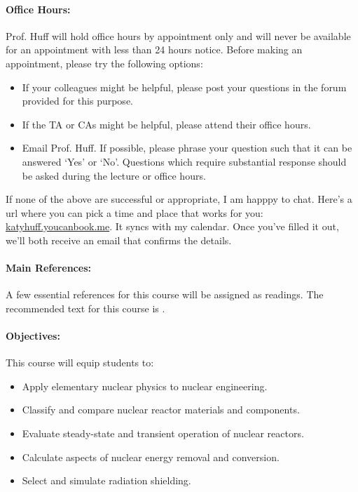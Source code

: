 \documentclass[11pt, a4paper]{article}
\begin{document}
\paragraph{Office Hours:} Prof. Huff will hold office hours by appointment only 
and will never be available for an appointment with less than 24 hours notice. 
Before making an appointment, please try the following options:
\begin{itemize}
\item If your colleagues might be helpful, please post your questions in the 
        forum provided for this purpose. 
\item If the TA or CAs might be helpful, please attend their office hours.
\item Email Prof. Huff. If possible, please phrase your question such that it 
        can be answered `Yes' or `No'.  Questions which require substantial 
        response should be asked during the lecture or office hours.
\end{itemize}

If none of the above are successful or appropriate, I am happpy to chat. 
Here's a url where you can pick a time and place that works for you: 
\href{http://katyhuff.youcanbook.me}{katyhuff.youcanbook.me}. It syncs with my 
calendar. Once you've filled it out, we'll both receive an email that confirms 
the details.

\paragraph{Main References:}
A few essential references for this course will be assigned as readings. The 
recommended text for this course is \cite{rec_text}.

\renewcommand{\refname}{\normalfont\selectfont\normalsize}\vspace{-1cm} 


\paragraph{Objectives:} 

This course will equip students to:

\begin{itemize}
\item Apply elementary nuclear physics to nuclear engineering. 
\item Classify and compare nuclear reactor materials and components.
\item Evaluate steady-state and transient operation of nuclear reactors.
\item Calculate aspects of nuclear energy removal and conversion.
\item Select and simulate radiation shielding.
\end{itemize}
\end{document}
